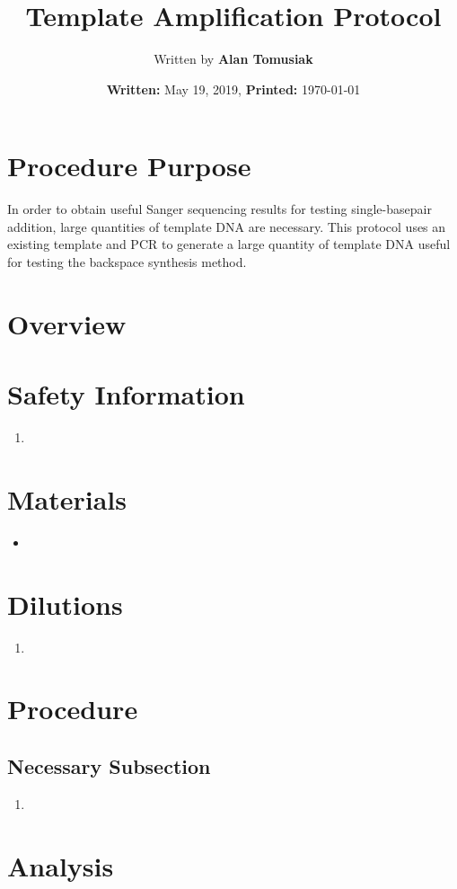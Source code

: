 \documentclass{ssiBio}
\title{Template Amplification Protocol}
\author{Written by \textbf{Alan Tomusiak}}
\date{\textbf{Written:} May 19, 2019, \textbf{Printed:} \today{}}
\begin{document}
\maketitle
\section{Procedure Purpose}
In order to obtain useful Sanger sequencing results for testing single-basepair addition, large quantities of template DNA are necessary. This protocol uses an existing template and PCR to generate a large quantity of template DNA useful for testing the backspace synthesis method.

\section{Overview}

\section{Safety Information}
\begin{safety}
\begin{enumerate}
\item{}
\end{enumerate}
\end{safety}

\section{Materials}
\begin{itemize}
\item{}
\end{itemize}

\section{Dilutions}
\begin{enumerate}
\item{}
\end{enumerate}

\section{Procedure}
\subsection{Necessary Subsection}
\begin{enumerate}
\item{}
\end{enumerate}

\section{Analysis}



\end{document}
